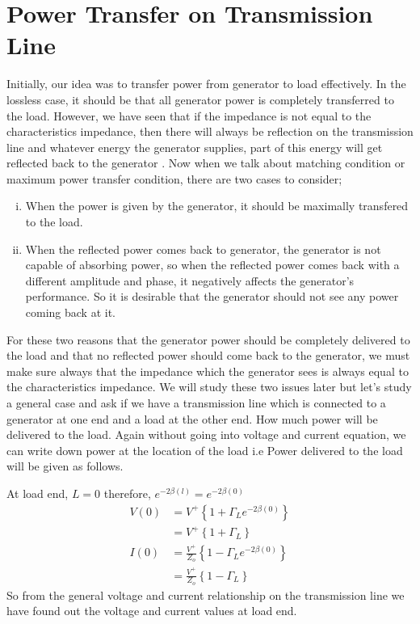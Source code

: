 \section{Power Transfer on Transmission Line}
Initially, our idea was to transfer power from generator to load effectively. In the lossless case, it should be that all generator power is completely transferred to the load. However, we have seen that if the impedance is not equal to the characteristics impedance, then there will always be reflection on the transmission line and whatever energy the generator supplies, part of this energy will get reflected back to the generator . Now when we talk about matching condition or maximum power transfer condition, there are two cases to consider;
\begin{enumerate}[(i)]
\item When the power is given by the generator, it should be maximally transfered to the load.
\item When the reflected power comes back to generator, the generator is not capable of absorbing power, so when the reflected power comes back with a different amplitude and phase, it negatively affects the generator's performance. So it is desirable that the generator should not see any power coming back at it.
\end{enumerate}
For these two reasons that the generator power should be completely delivered to the load and that no reflected power should come back to the generator, we must make sure always that the impedance which the generator sees is always equal to the characteristics impedance. We will study these two issues later but let's study a general case and ask if we have a transmission line which is connected to a generator at  one end and a load at the other end. How much power will be delivered to the load. Again without going into voltage and current equation, we can write down power at the location of the load i.e Power delivered to the load will be given as follows.

At load end, $L=0$ therefore, $e^{-2\beta (l)} = e^{-2\beta (0)}$
\begin{align*}
V(0) &= V^{+} \left\lbrace {1 + \Gamma_L e^{-2\beta(0)}}\right\rbrace\\ 
&= V^{+}\left\lbrace 1 +\Gamma_L \right\rbrace\\
I(0) &= \frac{V^{+}}{Z_o} \left\lbrace{1 - \Gamma_L e^{-2\beta(0)}}\right\rbrace\\ 
&= \frac{V^{+}}{Z_o}\left\lbrace1 -\Gamma_L \right\rbrace
\end{align*}
So from the general voltage and current relationship on the transmission line we have found  out the voltage and current values at load end.

